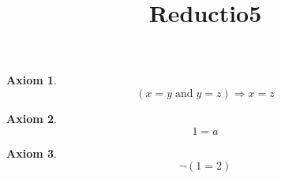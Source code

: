 \documentclass{article}
\newtheorem{axiom}{Axiom}
\begin{document}
            \title{Reductio5}
            \maketitle
            

\begin{axiom}
\begin{equation}
{{{{\left( {{x} = {y}} \; \mathrm{ and } \; {{y} = {z}}\right)} \Longrightarrow {{x} = {z}}}}}
\end{equation}
\end{axiom}

\begin{axiom}
\begin{equation}
{1} = {a}
\end{equation}
\end{axiom}

\begin{axiom}
\begin{equation}
\neg {\left( {1} = {2}\right)}
\end{equation}
\end{axiom}
\end{document}

